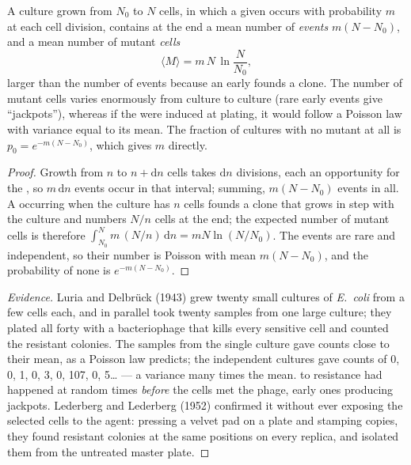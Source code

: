 \begin{theorem}\label{thm:b2:genome-diversification:luria}
A culture grown from $N_0$ to $N$ cells, in which a given 
occurs with probability $m$ at each cell division, contains at the
end a mean number of  \emph{events} $m(N - N_0)$, and a mean
number of mutant \emph{cells}
\[
\langle M\rangle = m\,N\,\ln\frac{N}{N_0},
\]
larger than the number of events because an early  founds a
clone. The number of mutant cells varies enormously from culture to
culture (rare early events give ``jackpots''), whereas if the
 were induced at plating, it would follow a Poisson law
with variance equal to its mean. The fraction of cultures with no
mutant at all is $p_0 = e^{-m(N - N_0)}$, which gives $m$ directly.
\end{theorem}
\begin{proof}
Growth from $n$ to $n + \mathrm{d}n$ cells takes $\mathrm{d}n$
divisions, each an opportunity for the , so $m\,\mathrm{d}n$
events occur in that interval; summing, $m(N - N_0)$ events in all.
A  occurring when the culture has $n$ cells founds a clone
that grows in step with the culture and numbers $N/n$ cells at the
end; the expected number of mutant cells is therefore
$\int_{N_0}^{N} m\,(N/n)\,\mathrm{d}n = mN\ln(N/N_0)$. The events
are rare and independent, so their number is Poisson with mean
$m(N - N_0)$, and the probability of none is $e^{-m(N - N_0)}$.
\end{proof}
\begin{proof}[Evidence]
Luria and Delbrück (1943) grew twenty small cultures of
\emph{E.~coli} from a few cells each, and in parallel took twenty
samples from one large culture; they plated all forty with a
bacteriophage that kills every sensitive cell and counted the
resistant colonies. The samples from the single culture gave counts
close to their mean, as a Poisson law predicts; the independent
cultures gave counts of 0, 0, 1, 0, 3, 0, 107, 0, 5\dots{} --- a
variance many times the mean.  to resistance had happened
at random times \emph{before} the cells met the phage, early ones
producing jackpots. Lederberg and Lederberg (1952) confirmed it
without ever exposing the selected cells to the agent: pressing a
velvet pad on a plate and stamping copies, they found resistant
colonies at the same positions on every replica, and isolated them
from the untreated master plate.
\end{proof}

